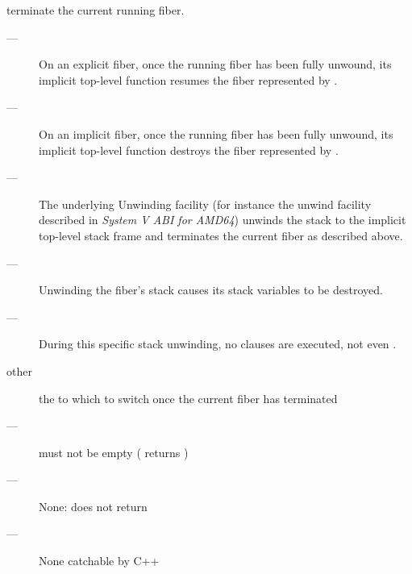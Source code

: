 \effects
terminate the current running fiber.

\remarks
\begin{description}
    \item[---] On an explicit fiber, once the running fiber has
               been fully unwound, its implicit top-level function resumes the fiber represented
               by . 
    \item[---] On an implicit fiber, once the running fiber has been fully
               unwound, its implicit top-level function destroys the fiber represented
               by .
    \item[---] The underlying Unwinding facility (for instance the unwind facility
               described in \emph{System V ABI for AMD64}) unwinds the stack
               to the implicit top-level stack frame and terminates the
               current fiber as described above.
    \item[---] Unwinding the fiber's stack causes its stack variables to be
               destroyed.
    \item[---] During this specific stack unwinding, 
               no  clauses are executed, not even \catchall.
\end{description}

\params
\begin{description}
    \item[other] the \fiber to which to switch once the current fiber has terminated
\end{description}

\requires
\begin{description}
    \item[---]  must not be empty ( returns )
\end{description}

\returns
\begin{description}
    \item[---] None: \unwindfib does not return
\end{description}

\except
\begin{description}
    \item[---] None catchable by C++
\end{description}
